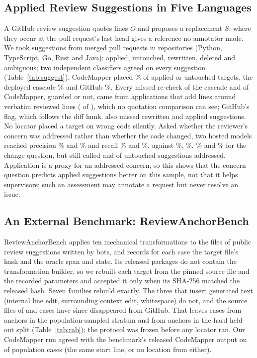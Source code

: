 \subsection{Applied Review Suggestions in Five Languages}
A GitHub review suggestion quotes lines $O$ and proposes a replacement $S$; where they occur at the pull request's last head gives a reference no annotator made. We took \wkUnits{} suggestions from \wkPRs{} merged pull requests in \wkRepos{} repositories (Python, TypeScript, Go, Rust and Java): \wkClsApplied{} applied, \wkClsUntouched{} untouched, \wkClsRewritten{} rewritten, \wkClsGone{} deleted and \wkClsAmbiguous{} ambiguous; two independent classifiers agreed on every suggestion (Table~\ref{tab:suggest}). CodeMapper placed \wkCmQPlace\% of applied or untouched targets, the deployed cascade \wkDepPlace\% and GitHub \wkGhPlace\%. Every missed re-check of the cascade and of CodeMapper, guarded or not, came from applications that add lines around verbatim reviewed lines (\wkAppliedWrap{} of \wkClsApplied{}), which no quotation comparison can see; GitHub's flag, which follows the diff hunk, also missed rewritten and applied suggestions. No locator placed a target on wrong code silently. Asked whether the reviewer's concern was addressed rather than whether the code changed, two hosted models reached precision \wkBeamClaimPrecision\% and \wkNemoClaimPrecision\% and recall \wkBeamClaimRecall\% and \wkNemoClaimRecall\%, against \wkBeamDiffPrecision\%, \wkNemoDiffPrecision\%, \wkBeamDiffRecall\% and \wkNemoDiffRecall\% for the change question, but still called \wkBeamClaimFP{} and \wkNemoClaimFP{} of \wkLlmUntouched{} untouched suggestions addressed. Application is a proxy for an addressed concern, so this shows that the concern question predicts applied suggestions better on this sample, not that it helps supervisors; such an assessment may annotate a request but never resolve an issue.

\subsection{An External Benchmark: ReviewAnchorBench}\label{sec:rab}
ReviewAnchorBench \cite{fu2026reviewanchorbench} applies ten mechanical transformations to the files of public review suggestions written by bots, and records for each case the target file's hash and the oracle span and state. Its released packages do not contain the transformation builder, so we rebuilt each target from the pinned source file and the recorded parameters and accepted it only when its SHA-256 matched the released hash. Seven families rebuild exactly. The three that insert generated text (internal line edit, surrounding context edit, whitespace) do not, and the source files of \wrPopUnavailable{} and \wrHardUnavailable{} cases have since disappeared from GitHub. That leaves \wrPopCases{} cases from \wrPopAnchors{} anchors in the population-sampled stratum and \wrHardCases{} from \wrHardAnchors{} anchors in the hard held-out split (Table~\ref{tab:rab}); the protocol was frozen before any locator ran. Our CodeMapper run agreed with the benchmark's released CodeMapper output on \wrCmAgreeK{} of \wrCmAgreeN{} population cases (the same start line, or no location from either).

